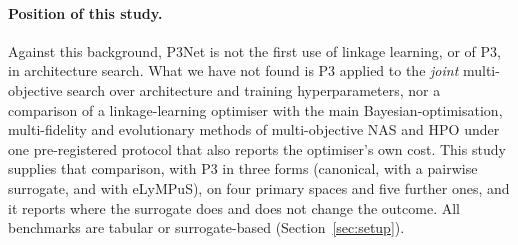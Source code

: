 \paragraph{Position of this study.} Against this background, P3Net is not the first use of linkage learning, or of
P3, in architecture search. What we have not found is P3 applied to the \emph{joint} multi-objective search over
architecture and training hyperparameters, nor a comparison of a linkage-learning optimiser with the main
Bayesian-optimisation, multi-fidelity and evolutionary methods of multi-objective NAS and HPO under one
pre-registered protocol that also reports the optimiser's own cost. This study supplies that comparison, with P3
in three forms (canonical, with a pairwise surrogate, and with eLyMPuS), on four primary spaces and five further
ones, and it reports where the surrogate does and does not change the outcome. All benchmarks are tabular or
surrogate-based (Section~\ref{sec:setup}).
